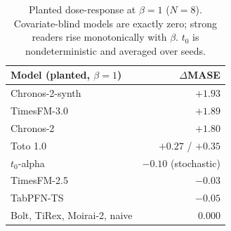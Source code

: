 \begin{table}[t]
\centering
\small
\begin{tabular}{@{}lr@{}}
\toprule
Model (planted, $\beta{=}1$) & $\Delta$MASE \\
\midrule
Chronos-2-synth & $+1.93$ \\
TimesFM-3.0 & $+1.89$ \\
Chronos-2 & $+1.80$ \\
Toto 1.0 & $+0.27$ / $+0.35$ \\
$t_0$-alpha & $-0.10$ (stochastic) \\
TimesFM-2.5 & $-0.03$ \\
TabPFN-TS & $-0.05$ \\
\midrule
Bolt, TiRex, Moirai-2, naive & $0.000$ \\
\bottomrule
\end{tabular}
\caption{Planted dose-response at $\beta=1$ ($N=8$). Covariate-blind models are
exactly zero; strong readers rise monotonically with $\beta$. $t_0$ is
nondeterministic and averaged over seeds.}
\label{tab:planted}
\end{table}
